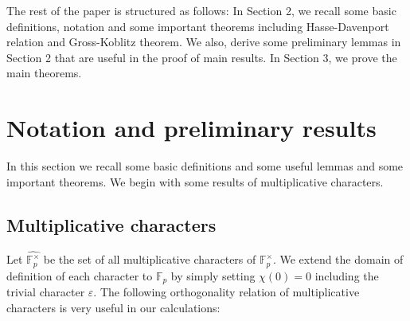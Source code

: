 \documentclass[12pt]{amsart}
\theoremstyle{plain}
\theoremstyle{definition}
\theoremstyle{remark}
\newcommand{\F}{\mathbb{F}}
\numberwithin{equation}{section}
\begin{document}
The rest of the paper is structured as follows: In Section 2, we recall some basic definitions, notation and some important theorems including Hasse-Davenport relation and Gross-Koblitz theorem. We also, derive some preliminary lemmas in Section 2 that are useful in the proof of main results. In Section 3, we prove the main theorems.

	
	\section{Notation and preliminary results}
	In this section we recall some basic definitions and some useful lemmas and some important theorems.  We begin with some results of multiplicative characters.
	
	
	
	
	
	\subsection{Multiplicative characters}
	
	
 Let $\widehat{\F_p^{\times}}$ be the set of all multiplicative characters of $\F_p^{\times}$.  We extend the domain of definition of each character to $\mathbb{F}_p$ by simply setting $\chi(0)=0$  including the trivial character $\varepsilon$. The following orthogonality relation of multiplicative characters is very useful in our calculations:
 
\end{document}
